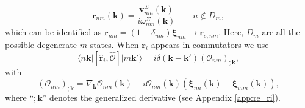 \begin{equation}\label{pmnrmn}
\mathbf{r}_{nm}(\mathbf{k})
= \frac{\mathbf{v}^\Sigma_{nm}(\mathbf{k})}{i\omega^\Sigma_{nm}(\mathbf{k})}
\qquad n\notin D_{m},
\end{equation} 
which can be identified as
$\mathbf{r}_{nm}=(1-\delta_{nm})\boldsymbol{\xi}_{nm}\to \mathbf{r}_{e,nm}$.
Here, $D_m$ are all the possible degenerate $m$-states. When $\mathbf{r}_{i}$
appears in commutators we use \cite{aversaPRB95}
\begin{equation}\label{conmri3n}
\langle n\mathbf{k}\vert
\left[
\hat{\mathbf{r}}_{i}, \hat{\mathcal{O}}
\right]
\vert m\mathbf{k}'\rangle
= i\delta(\mathbf{k} - \mathbf{k}')(\mathcal{O}_{nm})_{;\mathbf{k}},
\end{equation}  
with
\begin{equation}\label{gendevnn}
(\mathcal{O}_{nm})_{;\mathbf{k}} =
  \nabla_{\mathbf{k}}\mathcal{O}_{nm}(\mathbf{k})
- i\mathcal{O}_{nm}(\mathbf{k})
\left(
\boldsymbol{\xi}_{nn}(\mathbf{k}) - \boldsymbol{\xi}_{mm}(\mathbf{k})
\right),
\end{equation} 
where ``$;\mathbf{k}$'' denotes the generalized derivative (see Appendix
\ref{app:re_ri}).

